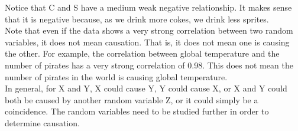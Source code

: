 \documentclass[12pt, letterpaper]{article}
\begin{document}
Notice that C and S have a medium weak negative relationship. It makes sense that it is negative because, as we drink more cokes, we drink less sprites.\\

Note that even if the data shows a very strong correlation between two random variables, it does not mean causation. That is, it does not mean one is causing the other. For example, the correlation between global temperature and the number of pirates has a very strong correlation of 0.98. This does not mean the number of pirates in the world is causing global temperature.\\

In general, for X and Y, X could cause Y, Y could cause X, or X and Y could both be caused by another random variable Z, or it could simply be a coincidence. The random variables need to be studied further in order to determine causation.\\
\end{document}
